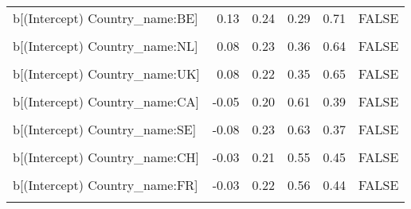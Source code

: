 \begin{table}
\begin{tabular}[t]{lrrrrl}
b[(Intercept) Country\_name:BE] & 0.13 & 0.24 & 0.29 & 0.71 & FALSE\\
\cellcolor{gray!10}{b[EPS Country\_name:BE]} & \cellcolor{gray!10}{0.13} & \cellcolor{gray!10}{0.09} & \cellcolor{gray!10}{0.07} & \cellcolor{gray!10}{0.93} & \cellcolor{gray!10}{FALSE}\\
b[(Intercept) Country\_name:NL] & 0.08 & 0.23 & 0.36 & 0.64 & FALSE\\
\cellcolor{gray!10}{b[EPS Country\_name:NL]} & \cellcolor{gray!10}{0.08} & \cellcolor{gray!10}{0.08} & \cellcolor{gray!10}{0.16} & \cellcolor{gray!10}{0.84} & \cellcolor{gray!10}{FALSE}\\
b[(Intercept) Country\_name:UK] & 0.08 & 0.22 & 0.35 & 0.65 & FALSE\\
\cellcolor{gray!10}{b[EPS Country\_name:UK]} & \cellcolor{gray!10}{0.09} & \cellcolor{gray!10}{0.08} & \cellcolor{gray!10}{0.12} & \cellcolor{gray!10}{0.88} & \cellcolor{gray!10}{FALSE}\\
b[(Intercept) Country\_name:CA] & -0.05 & 0.20 & 0.61 & 0.39 & FALSE\\
\cellcolor{gray!10}{b[EPS Country\_name:CA]} & \cellcolor{gray!10}{-0.05} & \cellcolor{gray!10}{0.08} & \cellcolor{gray!10}{0.76} & \cellcolor{gray!10}{0.24} & \cellcolor{gray!10}{FALSE}\\
b[(Intercept) Country\_name:SE] & -0.08 & 0.23 & 0.63 & 0.37 & FALSE\\
\cellcolor{gray!10}{b[EPS Country\_name:SE]} & \cellcolor{gray!10}{-0.09} & \cellcolor{gray!10}{0.08} & \cellcolor{gray!10}{0.88} & \cellcolor{gray!10}{0.12} & \cellcolor{gray!10}{FALSE}\\
b[(Intercept) Country\_name:CH] & -0.03 & 0.21 & 0.55 & 0.45 & FALSE\\
\cellcolor{gray!10}{b[EPS Country\_name:CH]} & \cellcolor{gray!10}{-0.04} & \cellcolor{gray!10}{0.07} & \cellcolor{gray!10}{0.72} & \cellcolor{gray!10}{0.28} & \cellcolor{gray!10}{FALSE}\\
b[(Intercept) Country\_name:FR] & -0.03 & 0.22 & 0.56 & 0.44 & FALSE\\
\cellcolor{gray!10}{b[EPS Country\_name:FR]} & \cellcolor{gray!10}{-0.05} & \cellcolor{gray!10}{0.07} & \cellcolor{gray!10}{0.73} & \cellcolor{gray!10}{0.27} & \cellcolor{gray!10}{FALSE}\\
\bottomrule
\end{tabular}
\end{table}

